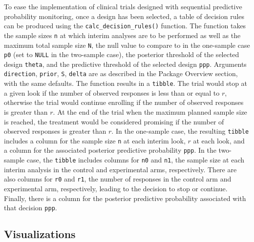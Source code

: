 To ease the implementation of clinical trials designed with sequential predictive probability monitoring, once a design has been selected, a table of decision rules can be produced using the \texttt{calc\_decision\_rules()} function. The function takes the sample sizes \texttt{n} at which interim analyses are to be performed as well as the maximum total sample size \texttt{N}, the null value to compare to in the one-sample case \texttt{p0} (set to \texttt{NULL} in the two-sample case), the posterior threshold of the selected design \texttt{theta}, and the predictive threshold of the selected design \texttt{ppp}. Arguments \texttt{direction}, \texttt{prior}, \texttt{S}, \texttt{delta} are as described in the Package Overview section, with the same defaults. The function results in a \texttt{tibble}. The trial would stop at a given look if the number of observed responses is less than or equal to \(r\), otherwise the trial would continue enrolling if the number of observed responses is greater than \(r\). At the end of the trial when the maximum planned sample size is reached, the treatment would be considered promising if the number of observed responses is greater than \(r\). In the one-sample case, the resulting \texttt{tibble} includes a column for the sample size \texttt{n} at each interim look, \(r\) at each look, and a column for the associated posterior predictive probability \texttt{ppp}. In the two-sample case, the \texttt{tibble} includes columns for \texttt{n0} and \texttt{n1}, the sample size at each interim analysis in the control and experimental arms, respectively. There are also columns for \texttt{r0} and \texttt{r1}, the number of responses in the control arm and experimental arm, respectively, leading to the decision to stop or continue. Finally, there is a column for the posterior predictive probability associated with that decision \texttt{ppp}.

\hypertarget{visualizations}{%
\subsection{Visualizations}\label{visualizations}}


